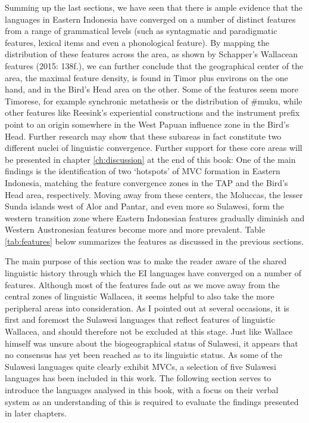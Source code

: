 Summing up the last sections, we have seen that there is ample evidence that the languages in Eastern Indonesia have converged on a number of distinct features from a range of grammatical levels (such as syntagmatic and paradigmatic features, lexical items and even a phonological feature). By mapping the distribution of these features across the area, as shown by Schapper's Wallacean features (2015:  138f.), we can further conclude that the geographical center of the area, the maximal feature density, is found in Timor plus environs on the one hand, and in the Bird's Head area on the other. Some of the features seem more Timorese, for example synchronic metathesis or the distribution of \#muku, while other features like Reesink's experiential constructions and the instrument prefix point to an origin somewhere in the West Papuan influence zone in the Bird's Head. Further research may show that these subareas in fact constitute two different nuclei of linguistic convergence. Further support for these core areas will be presented in chapter \ref{ch:discussion} at the end of this book: One of the main findings is the identification of two `hotspots' of MVC formation in Eastern Indonesia, matching the feature convergence zones in the TAP and the Bird's Head area, respectively. Moving away from these centers, the Moluccas, the lesser Sunda islands west of Alor and Pantar, and even more so Sulawesi, form the western transition zone where Eastern Indonesian features gradually diminish and Western Austronesian features become more and more prevalent. Table \ref{tab:features} below summarizes the features as discussed in the previous sections.

The main purpose of this section was to make the reader aware of the shared linguistic history through which the EI languages have converged on a number of features. Although most of the features fade out as we move away from the central zones of linguistic Wallacea, it seems helpful to also take the more peripheral areas into consideration. As I pointed out at several occasions, it is first and foremost the Sulawesi languages that reflect features of linguistic Wallacea, and should therefore not be excluded at this stage. Just like Wallace himself was unsure about the biogeographical status of Sulawesi, it appears that no consensus has yet been reached as to its linguistic status. As some of the Sulawesi languages quite clearly exhibit MVCs, a selection of five Sulawesi languages has been included in this work. The following section serves to introduce the languages analysed in this book, with a focus on their verbal system as an understanding of this is required to evaluate the findings presented in later chapters.

